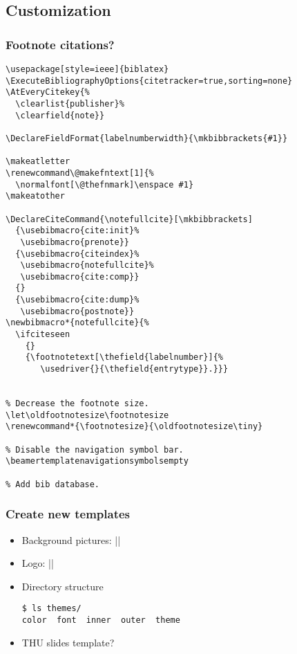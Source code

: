 \documentclass[CJKchecksingle]{beamer}
\begin{document}
\subsection{Customization}

\begin{frame}\frametitle{Footnote citations?}

\begin{lstlisting}
\usepackage[style=ieee]{biblatex}
\ExecuteBibliographyOptions{citetracker=true,sorting=none}
\AtEveryCitekey{%
  \clearlist{publisher}%
  \clearfield{note}}

\DeclareFieldFormat{labelnumberwidth}{\mkbibbrackets{#1}}

\makeatletter
\renewcommand\@makefntext[1]{%
  \normalfont[\@thefnmark]\enspace #1}
\makeatother

\DeclareCiteCommand{\notefullcite}[\mkbibbrackets]
  {\usebibmacro{cite:init}%
   \usebibmacro{prenote}}
  {\usebibmacro{citeindex}%
   \usebibmacro{notefullcite}%
   \usebibmacro{cite:comp}}
  {}
  {\usebibmacro{cite:dump}%
   \usebibmacro{postnote}}
\newbibmacro*{notefullcite}{%
  \ifciteseen
    {}
    {\footnotetext[\thefield{labelnumber}]{%
       \usedriver{}{\thefield{entrytype}}.}}}


% Decrease the footnote size.
\let\oldfootnotesize\footnotesize
\renewcommand*{\footnotesize}{\oldfootnotesize\tiny}

% Disable the navigation symbol bar.
\beamertemplatenavigationsymbolsempty

% Add bib database.

\end{lstlisting}
\end{frame}

\begin{frame}[fragile]\frametitle{Create new templates}

\begin{itemize}
\item
  Background pictures: |\usebackgroundtemplate|
\item
  Logo: |\logo|
\item
  Directory structure
\begin{lstlisting}[style=cli]
$ ls themes/
color  font  inner  outer  theme
\end{lstlisting}
\pause
\item
  THU slides template?
\end{itemize}

\end{frame}
\end{document}
